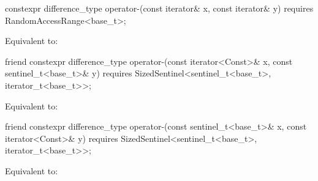 \begin{itemdecl}
constexpr difference_type operator-(const iterator& x, const iterator& y)
  requires RandomAccessRange<base_t>;
\end{itemdecl}

\begin{itemdescr}
\pnum
\effects
Equivalent to: 
\end{itemdescr}

\begin{itemdecl}
friend constexpr difference_type
  operator-(const iterator<Const>& x, const sentinel_t<base_t>& y)
    requires SizedSentinel<sentinel_t<base_t>, iterator_t<base_t>>;
\end{itemdecl}

\begin{itemdescr}
\pnum
\effects
Equivalent to: 
\end{itemdescr}

\begin{itemdecl}
friend constexpr difference_type
  operator-(const sentinel_t<base_t>& x, const iterator<Const>& y)
    requires SizedSentinel<sentinel_t<base_t>, iterator_t<base_t>>;
\end{itemdecl}

\begin{itemdescr}
\pnum
\effects
Equivalent to: 
\end{itemdescr}
